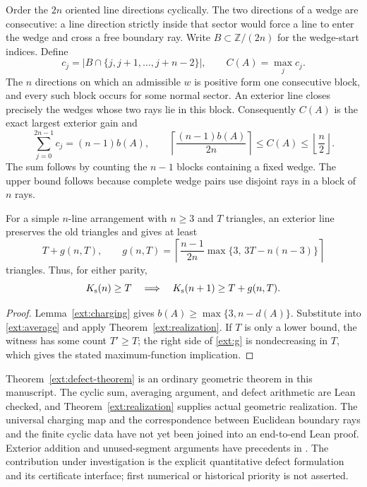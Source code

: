 Order the $2n$ oriented line directions cyclically.  The two directions
of a wedge are consecutive: a line direction strictly inside that sector
would force a line to enter the wedge and cross a free boundary ray.
Write $B\subset\mathbb Z/(2n)$ for the wedge-start indices.  Define
\begin{equation}
 c_j=\bigl|B\cap\{j,j+1,\ldots,j+n-2\}\bigr|,
 \qquad C(A)=\max_j c_j.
 \label{ext:profile}
\end{equation}
The $n$ directions on which an admissible $w$ is positive form one
consecutive block, and every such block occurs for some normal sector.
An exterior line closes precisely the wedges whose two rays lie in this
block.  Consequently $C(A)$ is the exact largest exterior gain and
\begin{equation}
 \sum_{j=0}^{2n-1}c_j=(n-1)b(A),\qquad
 \left\lceil\frac{(n-1)b(A)}{2n}\right\rceil
 \leq C(A)\leq\left\lfloor\frac n2\right\rfloor.
 \label{ext:average}
\end{equation}
The sum follows by counting the $n-1$ blocks containing a fixed wedge.
The upper bound follows because complete wedge pairs use disjoint rays
in a block of $n$ rays.

\begin{theorem}
\label{ext:defect-theorem}
For a simple $n$-line arrangement with $n\geq3$ and $T$ triangles, an
exterior line preserves the old triangles and gives at least
\begin{equation}
 T+g(n,T),\qquad
 g(n,T)=\left\lceil\frac{n-1}{2n}
       \max\{3,\,3T-n(n-3)\}\right\rceil
 \label{ext:g}
\end{equation}
triangles.  Thus, for either parity,
\[
 K_{\mathrm{s}}(n)\geq T\quad\Longrightarrow\quad
 K_{\mathrm{s}}(n+1)\geq T+g(n,T).
\]
\end{theorem}

\begin{proof}
Lemma~\ref{ext:charging} gives
$b(A)\geq\max\{3,n-d(A)\}$.  Substitute into
\eqref{ext:average} and apply Theorem~\ref{ext:realization}.  If $T$ is
only a lower bound, the witness has some count $T'\geq T$; the right side
of \eqref{ext:g} is nondecreasing in $T$, which gives the stated
maximum-function implication.
\end{proof}

\begin{remark}
\label{ext:defect-scope}
Theorem~\ref{ext:defect-theorem} is an ordinary geometric theorem in this
manuscript.  The cyclic sum, averaging argument, and defect arithmetic are
Lean checked, and Theorem~\ref{ext:realization} supplies actual geometric
realization.  The universal charging map and the correspondence between
Euclidean boundary rays and the finite cyclic data have not yet been
joined into an end-to-end Lean proof.  Exterior addition and
unused-segment arguments have precedents in
\cite{bbl2008,blanc2011}.  The contribution under investigation is the
explicit quantitative defect formulation and its certificate interface;
first numerical or historical priority is not asserted.
\end{remark}

